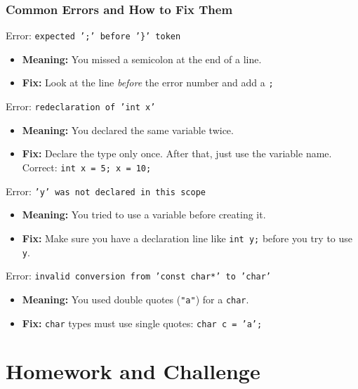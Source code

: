 \documentclass{beamer}
\begin{document}
\begin{frame}
\frametitle{Common Errors and How to Fix Them}
\begin{alertblock}{Error: \texttt{expected ';' before '\}' token}}
\begin{itemize}
    \item \textbf{Meaning:} You missed a semicolon at the end of a line.
    \item \textbf{Fix:} Look at the line \textit{before} the error number and add a \texttt{;}
\end{itemize}
\end{alertblock}

\begin{alertblock}{Error: \texttt{redeclaration of 'int x'}}
\begin{itemize}
    \item \textbf{Meaning:} You declared the same variable twice.
    \item \textbf{Fix:} Declare the type only once. After that, just use the variable name.\\
    Correct: \texttt{int x = 5; x = 10;}
\end{itemize}
\end{alertblock}

\begin{alertblock}{Error: \texttt{'y' was not declared in this scope}}
\begin{itemize}
    \item \textbf{Meaning:} You tried to use a variable before creating it.
    \item \textbf{Fix:} Make sure you have a declaration line like \texttt{int y;} before you try to use \texttt{y}.
\end{itemize}
\end{alertblock}

\begin{alertblock}{Error: \texttt{invalid conversion from 'const char*' to 'char'}}
\begin{itemize}
    \item \textbf{Meaning:} You used double quotes (\texttt{"a"}) for a \texttt{char}.
    \item \textbf{Fix:} \texttt{char} types must use single quotes: \texttt{char c = 'a';}
\end{itemize}
\end{alertblock}
\end{frame}

\section{Homework and Challenge}
\end{document}
